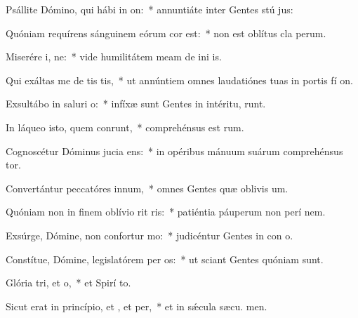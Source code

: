 \item Psállite Dómino, qui hábi in on:~* annuntiáte inter Gentes stú jus:
\item Quóniam requírens sánguinem eórum cor est:~* non est oblítus cla perum.
\item Miserére i, ne:~* vide humilitátem meam de ini is.
\item Qui exáltas me de tis tis,~* ut annúntiem omnes laudatiónes tuas in portis fí on.
\item Exsultábo in saluri o:~* infíxæ sunt Gentes in intéritu,  runt.
\item In láqueo isto, quem conrunt,~* comprehénsus est  rum.
\item Cognoscétur Dóminus jucia ens:~* in opéribus mánuum suárum comprehénsus  tor.
\item Convertántur peccatóres  innum,~* omnes Gentes quæ oblivis um.
\item Quóniam non in finem oblívio rit ris:~* patiéntia páuperum non perí  nem.
\item Exsúrge, Dómine, non confortur mo:~* judicéntur Gentes in con o.
\item Constítue, Dómine, legislatórem per os:~* ut sciant Gentes quóniam  sunt.
\item Glória tri, et o,~* et Spirí to.
\item Sicut erat in princípio, et , et per,~* et in sǽcula sæcu. men.
